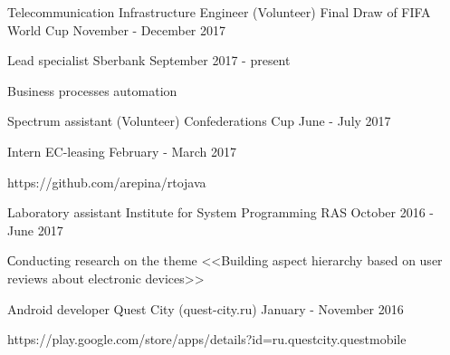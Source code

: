 



\begin{cventries}
\cventrynodescription
{Telecommunication Infrastructure Engineer (Volunteer)} %
{Final Draw of FIFA World Cup} %
{} %
{November - December 2017} %
	
	
\cventry
{Lead specialist} %
{Sberbank} %
{} %
{September 2017 - present} %
{ 
	\begin{cvitems}
		\item {Business processes automation}
	\end{cvitems}
}
	
\cventrynodescription
{Spectrum assistant (Volunteer)} %
{Confederations Cup} %
{} %
{June - July 2017} %


\cventry
{Intern} %
{EC-leasing} %
{} %
{February - March 2017} %
{ 
	\begin{cvitems}
		\item {https://github.com/arepina/rtojava}
	\end{cvitems}
}



\cventry
{Laboratory assistant} %
{Institute for System Programming RAS} %
{} %
{October 2016 - June 2017} %
{ 
	\begin{cvitems}
		\item {Сonducting research on the theme <<Building aspect hierarchy based on user reviews about electronic devices>>}
	\end{cvitems}
}


\cventry
{Android developer} %
{Quest City (quest-city.ru)} %
{} %
{January - November 2016} %
{ %
  \begin{cvitems}
\item {https://play.google.com/store/apps/details?id=ru.questcity.questmobile}
 \end{cvitems}
}


\end{cventries}

